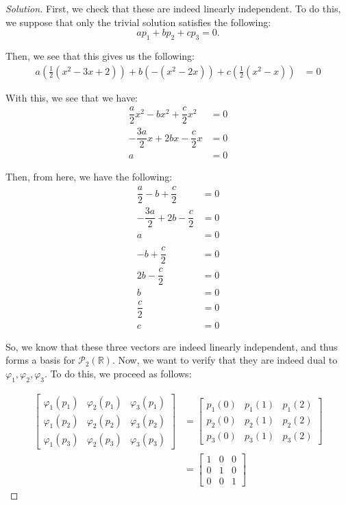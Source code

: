 \documentclass{article}
\newenvironment{solution}{\begin{proof}[Solution]}{\end{proof}}
\newcommand{\RR}{\mathbb{R}}
\begin{document}
\begin{solution}
		First, we check that these are indeed linearly independent. To do this, we suppose that only the trivial solution satisfies the following:
		\begin{equation*}
			ap_{1} + bp_{2} + cp_{3} = 0.
		\end{equation*}
	
		Then, we see that this gives us the following:
		\begin{align*}
			a\left(\frac{1}{2}(x^{2} - 3x + 2)\right) + b\left(-(x^{2} - 2x)\right) + c\left(\frac{1}{2}(x^{2} - x)\right) &= 0
		\end{align*}
	
		With this, we see that we have:
		\begin{align*}
			\dfrac{a}{2}x^{2} -bx^{2} + \dfrac{c}{2}x^{2} &= 0 \\
			-\dfrac{3a}{2} x + 2bx - \dfrac{c}{2}x  &= 0 \\
			a &= 0
		\end{align*}
	
		Then, from here, we have the following:
		\begin{align*}
			\dfrac{a}{2} - b + \dfrac{c}{2} &= 0 \\
			-\dfrac{3a}{2} + 2b - \dfrac{c}{2} &= 0 \\
			a &= 0 \\
			\\
			-b + \dfrac{c}{2} &= 0 \\
			2b - \dfrac{c}{2} &= 0 \\
			b &= 0
			\\
			\dfrac{c}{2} &= 0 \\
			c &= 0
		\end{align*}
	
		So, we know that these three vectors are indeed linearly independent, and thus forms a basis for $\mathscr{P}_{2}(\RR)$. Now, we want to verify that they are indeed dual to $\varphi_{1}, \varphi_{2}, \varphi_{3}$. To do this, we proceed as follows:
			
		\begin{align*}
			\begin{bmatrix}
				\varphi_{1}(p_{1}) & \varphi_{2}(p_{1}) & \varphi_{3}(p_{1}) \\
				\varphi_1(p_{2}) & \varphi_2(p_{2}) & \varphi_{3}(p_{2}) \\
				\varphi_1(p_{3}) & \varphi_2(p_{3}) & \varphi_3(p_{3})
			\end{bmatrix}
			&=
				\begin{bmatrix}
					p_{1}(0) & p_{1}(1) & p_{1}(2) \\
					p_{2}(0) & p_{2}(1) & p_{2}(2) \\
					p_{3}(0) & p_{3}(1) & p_{3}(2)
				\end{bmatrix} \\
	&=
		\begin{bmatrix}
			1 & 0 & 0 \\ 0 & 1 & 0 \\ 0 & 0 & 1
		\end{bmatrix}
		\end{align*}
	

\end{solution}
\end{document}
